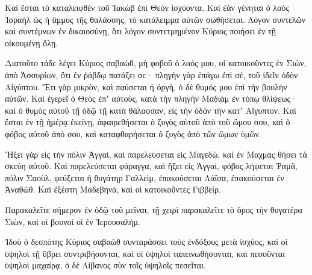 {Καὶ ἔσται τὸ καταλειφθὲν τοῦ Ἰακὼβ ἐπὶ Θεὸν ἰσχύοντα.
Καὶ ἐὰν γένηται ὁ λαὸς Ἰσραὴλ ὡς ἡ ἄμμος τῆς θαλάσσης, τὸ κατάλειμμα αὐτῶν σωθήσεται.
Λόγον συντελῶν καὶ συντέμνων ἐν δικαιοσύνῃ, ὅτι λόγον συντετμημένον Κύριος ποιήσει ἐν τῇ οἰκουμένῃ ὅλῃ.
\par }{\PP {}Διατοῦτο τάδε λέγει Κύριος σαβαὼθ, μὴ φοβοῦ ὁ λαός μου, οἱ κατοικοῦντες ἐν Σιὼν, ἀπὸ Ἀσσυρίων, ὅτι ἐν ῥάβδῳ πατάξει σε· πληγὴν γὰρ ἐπάγω ἐπὶ σὲ, τοῦ ἰδεῖν ὁδὸν Αἰγύπτου.
Ἔτι γὰρ μικρὸν, καὶ παύσεται ἡ ὀργὴ, ὁ δὲ θυμός μου ἐπὶ τὴν βουλὴν αὐτῶν.
Καὶ ἐγερεῖ ὁ Θεὸς ἐπʼ αὐτοὺς, κατὰ τὴν πληγὴν Μαδιὰμ ἐν τόπῳ θλίψεως· καὶ ὁ θυμὸς αὐτοῦ τῇ ὁδῷ τῇ κατὰ θάλασσαν, εἰς τὴν ὁδὸν τὴν κατʼ Αἴγυπτον.
Καὶ ἔσται ἐν τῇ ἡμέρᾳ ἐκείνῃ, ἀφαιρεθήσεται ὁ ζυγὸς αὐτοῦ ἀπὸ τοῦ ὤμου σου, καὶ ὁ φόβος αὐτοῦ ἀπό σου, καὶ καταφθαρήσεται ὁ ζυγὸς ἀπὸ τῶν ὤμων ὑμῶν.
\par }{\PP {}Ἥξει γὰρ εἰς τὴν πόλιν Ἀγγαί, καὶ παρελεύσεται εἰς Μαγεδὼ, καὶ ἐν Μαχμὰς θήσει τὰ σκεύη αὐτοῦ.
Καὶ παρελεύσεται φάραγγα, καὶ ἥξει εἰς Ἀγγαί, φόβος λήψεται Ῥαμᾶ, πόλιν Σαοὺλ, φεύξεται
ἡ θυγάτηρ Γαλλεὶμ, ἐπακούσεται Λάϊσα, ἐπακούσεται ἐν Ἀναθώθ.
Καὶ ἐξέστη Μαδεβηνὰ, καὶ οἱ κατοικοῦντες Γιββείρ.
\par }{\PP {}Παρακαλεῖτε σήμερον ἐν ὁδῷ τοῦ μεῖναι, τῇ χειρὶ παρακαλεῖτε τὸ ὄρος τὴν θυγατέρα Σιὼν, καὶ οἱ βουνοὶ οἱ ἐν Ἱερουσαλήμ.
\par }{\PP {}Ἰδοὺ ὁ δεσπότης Κύριος σαβαὼθ συνταράσσει τοὺς ἐνδόξους μετὰ ἰσχύος, καὶ οἱ ὑψηλοὶ τῇ ὕβρει συντριβήσονται, καὶ οἱ ὑψηλοὶ ταπεινωθήσονται,
καὶ πεσοῦνται ὑψηλοὶ μαχαίρᾳ, ὁ δὲ Λίβανος σὺν τοῖς ὑψηλοῖς πεσεῖται.

}
